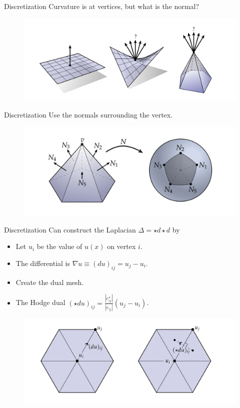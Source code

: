 \documentclass[UKenglish]{beamer}
\begin{document}
\begin{frame}{Discretization}
    Curvature is at vertices, but what is the normal?
    \vspace*{.5cm}
    \begin{figure}
        \centering
        \includegraphics[width=\textwidth]{Figures/discrete_normal.png}
    \end{figure}
\end{frame}

\begin{frame}{Discretization}
    Use the normals surrounding the vertex.
    \vspace*{1cm}
    \begin{figure}
        \centering
        \includegraphics[width=.8\textwidth]{Figures/discrete_curvature.png}
    \end{figure}
\end{frame}

\begin{frame}{Discretization}
    Can construct the Laplacian $\Delta=\star d \star d$ by
    \begin{itemize}
        \item Let $u_i$ be the value of $u(x)$ on vertex $i$.
        \item The differential is $\nabla u \equiv (du)_{ij}=u_j-u_i$.
        \item Create the dual mesh.
        \item The Hodge dual $\displaystyle{(\star du)_{ij}=\frac{|e_{ij}^\star|}{|e_{ij}|}}(u_j-u_i)$.
    \end{itemize}
    \begin{figure}
        \centering
        \includegraphics[width=.8\textwidth]{Figures/discrete_differentials.png}
    \end{figure}
\end{frame}
\end{document}
